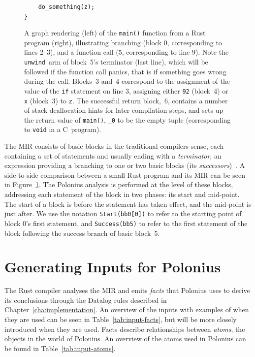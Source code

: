 \documentclass[11pt,a4paper,twoside,openany]{report}
\newenvironment{sourcecode}{\captionsetup{type=listing}}{}
\newcommand{\InRust}[1]{\texttt{#1}}
\begin{document}
\begin{figure}
\begin{minipage}{.5\textwidth}
\begin{sourcecode}
\begin{verbatim}
    do_something(z);
}
\end{verbatim}
\end{sourcecode}
\end{minipage}
\caption[MIR of a Small Rust Program With Function Call]{A graph rendering
  (left) of the \InRust{main()} function from a Rust program (right),
  illustrating branching (block 0, corresponding to lines 2--3), and a function
  call (5, corresponding to line 9). Note the \texttt{unwind}~arm of block~5's
  terminator (last line), which will be followed if the function call panics,
  that is if something goes wrong during the call. Blocks~3 and~4 correspond to
  the assignment of the value of the \InRust{if} statement on line 3, assigning
  either \InRust{92} (block~4) or \InRust{x} (block~3) to \InRust{z}. The
  successful return block,~6, contains a number of stack deallocation hints for
  later compilation steps, and sets up the return value of \InRust{main()},
  \InRust{_0} to be the empty tuple (corresponding to \texttt{void} in a
  C~program).}
  \label{fig:mir-example}
\end{figure}

The MIR consists of basic blocks in the traditional compilers sense, each
containing a set of statements and usually ending with a \emph{terminator}, an
expression providing a branching to one or two basic blocks (its
\emph{successors})~\cite{mir_rfc}. A side-to-side comparison between a small
Rust program and its MIR can be seen in Figure~\ref{fig:mir-example}. The
Polonius analysis is performed at the level of these blocks, addressing each
statement of the block in two phases: its start and mid-point. The start of a
block is before the statement has taken effect, and the mid-point is just after.
We use the notation \InRust{Start(bb0[0])} to refer to the starting point of
block 0's first statement, and \InRust{Success(bb5)} to refer to the first
statement of the block following the success branch of basic block~5.

\section{Generating Inputs for Polonius}

The Rust compiler analyses the MIR and emits \textit{facts} that Polonius uses
to derive its conclusions through the Datalog rules described in
Chapter~\ref{cha:implementation}. An overview of the inputs with examples of
when they are used can be seen in Table~\ref{tab:input-facts}, but will be more
closely introduced when they are used. Facts describe relationships between
\textit{atoms}, the objects in the world of Polonius. An overview of the atoms
used in Polonius can be found in Table~\ref{tab:input-atoms}.
\end{document}
